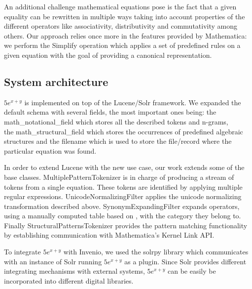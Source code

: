 \documentclass{sig-alternate}
\begin{document}
An additional challenge mathematical equations pose is the fact that a given equality can be rewritten in multiple ways taking into account properties of the different operators like associativity, distributivity and commutativity among others. Our approach relies once more in the features provided by Mathematica: we perform the {\codefont Simplify} operation which applies a set of predefined rules on a given equation with the goal of providing a canonical representation.

\subsection{System architecture}
$5e^{x+y}$ is implemented on top of the Lucene/Solr \cite{solr} framework. We expanded the default schema with several fields, the most important ones being: the {\codefont math\_notational\_field} which stores all the described tokens and n-grams, \\ the {\codefont math\_structural\_field} which stores the occurrences of predefined algebraic structures and the {\codefont filename} which is used to store the file/record where the particular equation was found. 

In order to extend Lucene with the new use case, our work extends some of the base classes. {\codefont MultiplePatternTokenizer} is in charge of producing a stream of tokens from a single equation. These tokens are identified by applying multiple regular expressions. {\codefont UnicodeNormalizingFilter} applies the unicode normalizing transformation described above. {\codefont SynonymExpandingFilter} expands operators, using a manually computed table based on \cite{math_groups}, with the category they belong to. Finally {\codefont StructuralPatternsTokenizer} provides the pattern matching functionality by establishing communication with Mathematica's {\codefont Kernel Link} API.

To integrate $5e^{x+y}$ with Invenio, we used the {\codefont solrpy} library which communicates with an instance of Solr running $5e^{x+y}$ as a plugin. Since Solr provides different integrating mechanisms with external systems, $5e^{x+y}$ can be easily be incorporated into different digital libraries.
\end{document}
